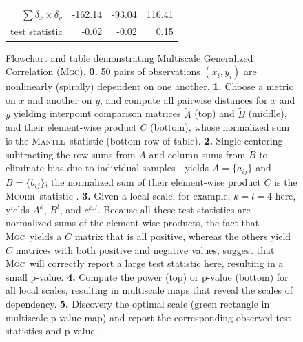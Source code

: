 \documentclass[11pt]{article}
\providecommand{\sct}[1]{{\normalfont\textsc{#1}}}
\newcommand{\G}{c}
\newcommand{\Mgc}{\sct{Mgc}}
\newcommand{\Mcorr}{\sct{Mcorr}}
\newcommand{\Mantel}{\sct{Mantel}}
\begin{document}
\begin{figure}[htbp]
\begin{tabular}{r  r   r   r}
\hline
 $\sum{\delta_x \times \delta_y}$ & \color{magenta}-162.14   & \color{magenta}-93.04 & \color{green}116.41  \\ 
 test statistic &  \color{magenta}-0.02  & \color{magenta}-0.02 & \color{green}0.15  \\  
\end{tabular}
\caption{
Flowchart  and table demonstrating Multiscale Generalized Correlation (\Mgc). 
\textbf{0.} 50 pairs of observations $(x_i,y_i)$ are nonlinearly (spirally) dependent on one another.
% 
\textbf{1.} Choose a metric on $x$ and another on $y$, and compute all pairwise distances for $x$ and $y$ yielding interpoint comparison matrices
 $\tilde{A}$ (top) and $\tilde{B}$ (middle), 
and their element-wise product $\tilde{C}$ (bottom), whose normalized sum is the  \Mantel~statistic \cite{Mantel1967} (bottom row of table).
% 
\textbf{2.} Single centering---subtracting the row-sums from $\tilde{A}$ and column-sums from $\tilde{B}$ to eliminate bias due to individual samples---yields $A=\{a_{ij}\}$ and $B=\{b_{ij}\}$; the normalized sum of their  element-wise product  $C$ is the  \Mcorr~statistic \cite{SzekelyRizzo2013a}.
% 
\textbf{3.} Given a local scale, for example, $k=l=4$ here, yields $A^{k}$, $B^{l}$, and $\G^{k,l}$.  Because all these test statistics are normalized sums of the element-wise products, the fact that \Mgc~yields a $C$ matrix that is all positive, whereas the others yield $C$ matrices with both positive and negative values, suggest that \Mgc~will correctly report a large test statistic here, resulting in a small p-value.
\textbf{4.} Compute the power (top) or p-value (bottom) for all local scales, resulting in multiscale maps that reveal the  scales of dependency. 
\textbf{5.} Discovery the optimal scale (green rectangle in multiscale p-value map) and report the corresponding observed test statistics and p-value. 
}
\end{figure}
\end{document}

